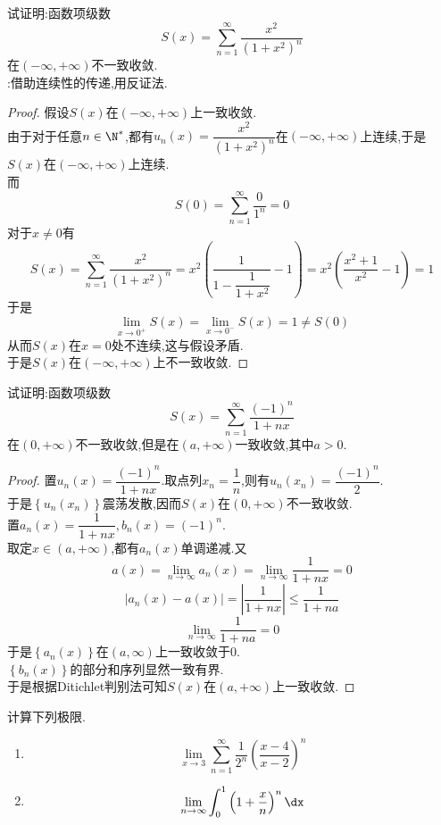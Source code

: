\documentclass{ctexart}
\begin{document}
\pagestyle{empty}
\begin{center}
    \large{}
\end{center}
\begin{problem}[L.10.1]
    试证明:函数项级数
    \[S(x)=\sum_{n=1}^\infty\dfrac{x^2}{\left(1+x^2\right)^n}\]
    在$(-\infty,+\infty)$不一致收敛.\\
    :借助连续性的传递,用反证法.
\end{problem}
\begin{proof}
    假设$S(x)$在$(-\infty,+\infty)$上一致收敛.\\
    由于对于任意$n\in\N^*$,都有$u_n(x)=\dfrac{x^2}{\left(1+x^2\right)^n}$在$(-\infty,+\infty)$上连续,于是$S(x)$在$(-\infty,+\infty)$上连续.\\
    而
    \[S(0)=\sum_{n=1}^\infty\dfrac{0}{1^n}=0\]
    对于$x\neq0$有
    \[S(x)=\sum_{n=1}^\infty\dfrac{x^2}{\left(1+x^2\right)^n}=x^2\left(\dfrac{1}{1-\dfrac{1}{1+x^2}}-1\right)=x^2\left(\dfrac{x^2+1}{x^2}-1\right)=1\]
    于是
    \[\lim_{x\to0^+}S(x)=\lim_{x\to 0^-}S(x)=1\neq S(0)\]
    从而$S(x)$在$x=0$处不连续,这与假设矛盾.\\
    于是$S(x)$在$(-\infty,+\infty)$上不一致收敛.
\end{proof}
\begin{problem}[L.10.2]
    试证明:函数项级数
    \[S(x)=\sum_{n=1}^\infty\dfrac{(-1)^n}{1+nx}\]
    在$(0,+\infty)$不一致收敛,但是在$(a,+\infty)$一致收敛,其中$a>0$.
\end{problem}
\begin{proof}
    置$u_n(x)=\dfrac{(-1)^n}{1+nx}$.取点列$x_n=\dfrac{1}{n}$,则有$u_n\left(x_n\right)=\dfrac{(-1)^n}{2}$.\\
    于是$\left\{u_n\left(x_n\right)\right\}$震荡发散,因而$S(x)$在$(0,+\infty)$不一致收敛.\\
    置$a_n(x)=\dfrac{1}{1+nx},b_n(x)=(-1)^n$.\\
    取定$x\in(a,+\infty)$,都有$a_n(x)$单调递减.又
    \[a(x)=\lim_{n\to\infty}a_n(x)=\lim_{n\to\infty}\dfrac{1}{1+nx}=0\]
    \[\left|a_n(x)-a(x)\right|=\left|\dfrac{1}{1+nx}\right|\leqslant\dfrac{1}{1+na}\]
    \[\lim_{n\to\infty}\dfrac{1}{1+na}=0\]
    于是$\left\{a_n(x)\right\}$在$(a,\infty)$上一致收敛于$0$.\\
    $\left\{b_n(x)\right\}$的部分和序列显然一致有界.\\
    于是根据Ditichlet判别法可知$S(x)$在$(a,+\infty)$上一致收敛.
\end{proof}
\begin{problem}[L.10.3]
    计算下列极限.
    \begin{enumerate}[label=\tbf{(\arabic*)}]
        \item \[\lim_{x\to3}\sum_{n=1}^{\infty}\dfrac{1}{2^n}\left(\dfrac{x-4}{x-2}\right)^n\]
        \item \[\lim_{n\to\infty}\int_0^1\left(1+\dfrac xn\right)^n\dx\]
    \end{enumerate}
\end{problem}
\end{document}
